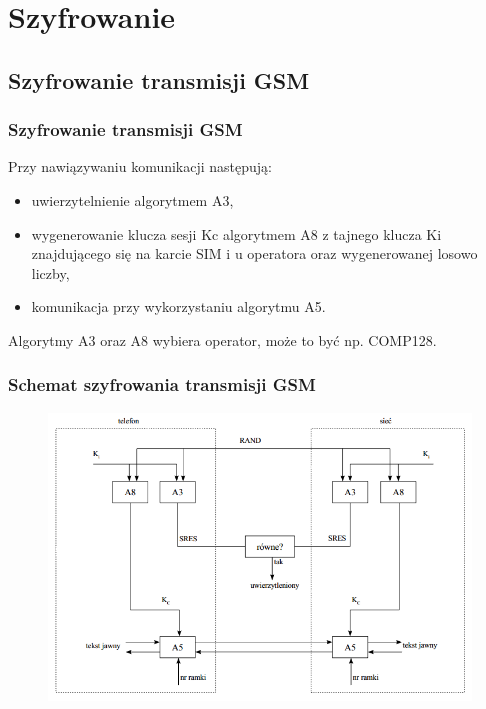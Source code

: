 \documentclass[xcolor=table]{beamer}
\begin{document}
\section{Szyfrowanie}


\subsection{Szyfrowanie transmisji GSM}
\begin{frame}
  \frametitle{Szyfrowanie transmisji GSM}
Przy nawiązywaniu komunikacji następują:
\begin{itemize}
\item uwierzytelnienie algorytmem A3,
\item wygenerowanie klucza sesji Kc algorytmem A8 z tajnego klucza Ki znajdującego się na karcie SIM i u operatora oraz wygenerowanej losowo liczby,
\item komunikacja przy wykorzystaniu algorytmu A5.
\end{itemize}
Algorytmy A3 oraz A8 wybiera operator, może to być np. COMP128.
\end{frame}

\begin{frame}
  \frametitle{Schemat szyfrowania transmisji GSM}
 \begin{center}
    \begin{figure}
      \includegraphics[width=1.0\textwidth]{gsm_schemat_szyfrowania}
    \end{figure}
  \end{center}
\end{frame}
\end{document}
